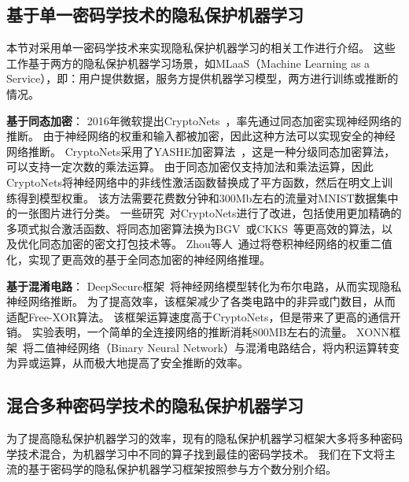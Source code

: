 \subsection{基于单一密码学技术的隐私保护机器学习}
本节对采用单一密码学技术来实现隐私保护机器学习的相关工作进行介绍。
%
这些工作基于两方的隐私保护机器学习场景，如MLaaS（Machine Learning as a Service），即：用户提供数据，服务方提供机器学习模型，两方进行训练或推断的情况。
%

\textbf{基于同态加密}：
2016年微软提出CryptoNets~\cite{gilad2016cryptonets}，率先通过同态加密实现神经网络的推断。
%
由于神经网络的权重和输入都被加密，因此这种方法可以实现安全的神经网络推断。
%
CryptoNets采用了YASHE加密算法~\cite{bos2013yashe}，这是一种分级同态加密算法，可以支持一定次数的乘法运算。
%
由于同态加密仅支持加法和乘法运算，因此CryptoNets将神经网络中的非线性激活函数替换成了平方函数，然后在明文上训练得到模型权重。
%
该方法需要花费数分钟和300Mb左右的流量对MNIST数据集中的一张图片进行分类。
%
%
一些研究~\cite{hesamifard2017cryptodl,chabanne2017pp_dnn}对CryptoNets进行了改进，包括使用更加精确的多项式拟合激活函数、将同态加密算法换为BGV~\cite{2014bgv}或CKKS~\cite{ckks2017}等更高效的算法，以及优化同态加密的密文打包技术等。
%
Zhou等人~\cite{zhoujunwei2020binary_encrypted_nn}通过将卷积神经网络的权重二值化，实现了更高效的基于全同态加密的神经网络推理。

\textbf{基于混淆电路}：
DeepSecure框架~\cite{rouhani2018deepsecure}将神经网络模型转化为布尔电路，从而实现隐私神经网络推断。
%
为了提高效率，该框架减少了各类电路中的非异或门数目，从而适配Free-XOR算法。
%
该框架运算速度高于CryptoNets，但是带来了更高的通信开销。
%
实验表明，一个简单的全连接网络的推断消耗800MB左右的流量。
%
XONN框架~\cite{riazi2019xonn}将二值神经网络（Binary Neural Network）与混淆电路结合，将内积运算转变为异或运算，从而极大地提高了安全推断的效率。


\subsection{混合多种密码学技术的隐私保护机器学习}
为了提高隐私保护机器学习的效率，现有的隐私保护机器学习框架大多将多种密码学技术混合，为机器学习中不同的算子找到最佳的密码学技术。
%
我们在下文将主流的基于密码学的隐私保护机器学习框架按照参与方个数分别介绍。


